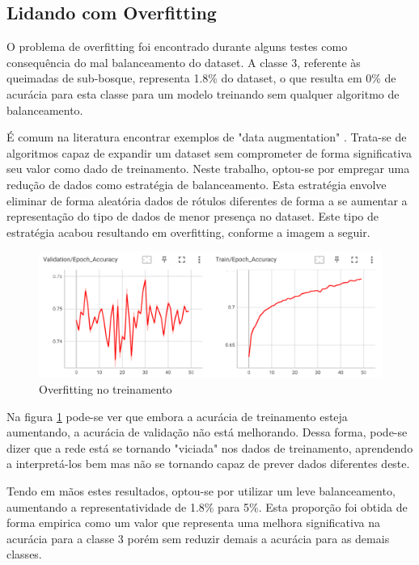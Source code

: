 \subsection{Lidando com Overfitting}
O problema de overfitting foi encontrado durante alguns testes como consequência do mal balanceamento do dataset. A classe 3, referente às queimadas de sub-bosque, representa 1.8\% do dataset, o que resulta em 0\% de acurácia para esta classe para um modelo treinando sem qualquer algoritmo de balanceamento.

É comum na literatura encontrar exemplos de "data augmentation" \cite{survey_data_augmentation}. Trata-se de algoritmos capaz de expandir um dataset sem comprometer de forma significativa seu valor como dado de treinamento. Neste trabalho, optou-se por empregar uma redução de dados como estratégia de balanceamento. Esta estratégia envolve eliminar de forma aleatória dados de rótulos diferentes de forma a se aumentar a representação do tipo de dados de menor presença no dataset. Este tipo de estratégia acabou resultando em overfitting, conforme a imagem a seguir.

\begin{figure}[ht]
    \centering
    \includegraphics[scale=0.5]{tg1/figuras/overfit.png}
    \caption{Overfitting no treinamento}
    \label{fig:overfitting}
\end{figure}

Na figura \ref{fig:overfitting} pode-se ver que embora a acurácia de treinamento esteja aumentando, a acurácia de validação não está melhorando. Dessa forma, pode-se dizer que a rede está se tornando "viciada" nos dados de treinamento, aprendendo a interpretá-los bem mas não se tornando capaz de prever dados diferentes deste.

Tendo em mãos estes resultados, optou-se por utilizar um leve balanceamento, aumentando a representatividade de 1.8\% para 5\%. Esta proporção foi obtida de forma empirica como um valor que representa uma melhora significativa na acurácia para a classe 3 porém sem reduzir demais a acurácia para as demais classes.


